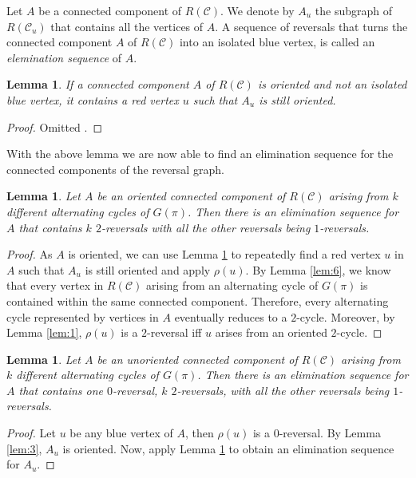 \documentclass[11pt,DIV=11]{scrartcl}
\newtheorem{lemma}[theorem]{Lemma}
\theoremstyle{definition}
\theoremstyle{remark}
\begin{document}
Let $A$ be a connected component of $R(\mathcal{C})$. We denote by $A_u$ the subgraph of $R(\mathcal{C}_u)$ that contains all the vertices of $A$. A sequence of reversals that turns the connected component $A$ of $R(\mathcal{C})$ into an isolated blue vertex, is called an \textit{elemination sequence} of $A$.

\begin{lemma}
\label{lem:7}
If a connected component $A$ of $R(\mathcal{C})$ is oriented and not an isolated blue vertex, it contains a red vertex $u$ such that $A_u$ is still oriented.
\end{lemma}

\begin{proof}
Omitted \cite{Christie1998}.
\end{proof}

With the above lemma we are now able to find an elimination sequence for the connected components of the reversal graph.

\begin{lemma}
\label{lem:8}
Let $A$ be an oriented connected component of $R(\mathcal{C})$ arising from $k$ different alternating cycles of $G(\pi)$. Then there is an elimination sequence for $A$ that contains $k$ $2$-reversals with all the other reversals being $1$-reversals.
\end{lemma}

\begin{proof}
As $A$ is oriented, we can use Lemma \ref{lem:7} to repeatedly find a red vertex $u$ in $A$ such that $A_u$ is still oriented and apply $\rho(u)$.
By Lemma \ref{lem:6}, we know that every vertex in $R(\mathcal{C})$ arising from an alternating cycle of $G(\pi)$ is contained within the same connected component. Therefore, every alternating cycle represented by vertices in $A$ eventually reduces to a $2$-cycle. Moreover, by Lemma \ref{lem:1}, $\rho(u)$ is a $2$-reversal iff $u$ arises from an oriented $2$-cycle.
\end{proof}

\begin{lemma}
\label{lem:9}
Let $A$ be an unoriented connected component of $R(\mathcal{C})$ arising from $k$ different alternating cycles of $G(\pi)$. Then there is an elimination sequence for $A$ that contains one $0$-reversal, $k$ $2$-reversals, with all the other reversals being $1$-reversals.
\end{lemma}

\begin{proof}
Let $u$ be any blue vertex of $A$, then $\rho(u)$ is a $0$-reversal. By Lemma \ref{lem:3}, $A_u$ is oriented.
Now, apply Lemma \ref{lem:8} to obtain an elimination sequence for $A_u$.
\end{proof}
\end{document}
